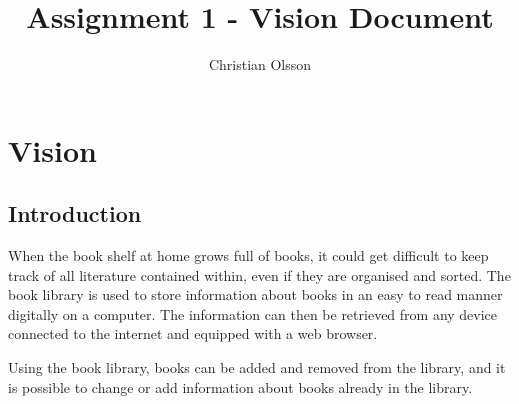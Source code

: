 \documentclass[fleqn,a4paper,11pt]{article}
\title{Assignment 1 - Vision Document}
\author{Christian Olsson}
\begin{document}
\maketitle                      %

\thispagestyle{empty}           %

\newpage                        %

\section{Vision}
\subsection{Introduction}
When the book shelf at home grows full of books, it could get difficult to keep track of all literature contained within, even if they are organised and sorted. The book library is used to store information about books in an easy to read manner digitally on a computer. The information can then be retrieved from any device connected to the internet and equipped with a web browser. 

Using the book library, books can be added and removed from the library, and it is possible to change or add information about books already in the library.
\end{document}
